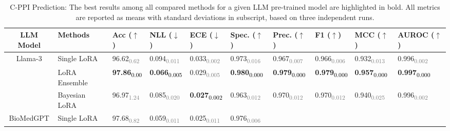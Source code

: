 \begin{table*}[htb]
\fontsize{8.75}{11}\selectfont
\centering
\caption{C-PPI Prediction: The best results among all compared methods for a given LLM pre-trained model are highlighted in bold. All metrics are reported as means with standard deviations in subscript, based on three independent runs.}
\label{table:c-ppi}
\begin{tabular}{c|l|*{8}{l}} %
\toprule
LLM Model & Methods & Acc ($\uparrow$) & NLL ($\downarrow$) & ECE ($\downarrow$) & Spec. ($\uparrow$) & Prec. ($\uparrow$) & F1 ($\uparrow$) & MCC ($\uparrow$) & AUROC ($\uparrow$) \\
\midrule
\multirow{3}{*}{Llama-3} & Single LoRA & 
96.62\textsubscript{\textcolor{gray}{0.62}} & 0.094\textsubscript{\textcolor{gray}{0.011}} & 
0.033\textsubscript{\textcolor{gray}{0.002}} & 0.973\textsubscript{\textcolor{gray}{0.016}} & 
0.967\textsubscript{\textcolor{gray}{0.007}} & 0.966\textsubscript{\textcolor{gray}{0.006}} & 
0.932\textsubscript{\textcolor{gray}{0.013}} & 0.996\textsubscript{\textcolor{gray}{0.002}} \\ 
& LoRA Ensemble & 
\textbf{97.86}\textsubscript{\textcolor{black}{0.00}} & \textbf{0.066}\textsubscript{\textcolor{black}{0.005}} & 
0.029\textsubscript{\textcolor{gray}{0.005}} & \textbf{0.980}\textsubscript{\textcolor{black}{0.000}} & 
\textbf{0.979}\textsubscript{\textcolor{black}{0.000}} & \textbf{0.979}\textsubscript{\textcolor{black}{0.000}} & 
\textbf{0.957}\textsubscript{\textcolor{black}{0.000}} & \textbf{0.997}\textsubscript{\textcolor{black}{0.000}} \\ 
& Bayesian LoRA & 
96.97\textsubscript{\textcolor{gray}{1.24}} & 0.085\textsubscript{\textcolor{gray}{0.020}} & 
\textbf{0.027}\textsubscript{\textcolor{black}{0.002}} & 0.963\textsubscript{\textcolor{gray}{0.012}} & 
0.970\textsubscript{\textcolor{gray}{0.012}} & 0.970\textsubscript{\textcolor{gray}{0.012}} & 
0.940\textsubscript{\textcolor{gray}{0.025}} & 0.996\textsubscript{\textcolor{gray}{0.002}} \\ 
\midrule
\multirow{3}{*}{BioMedGPT} & Single LoRA & 
97.68\textsubscript{\textcolor{gray}{0.82}} & 0.059\textsubscript{\textcolor{gray}{0.011}} & 
0.025\textsubscript{\textcolor{gray}{0.011}} & 0.976\textsubscript{\textcolor{gray}{0.006}} & 

\end{tabular}
\end{table*}
